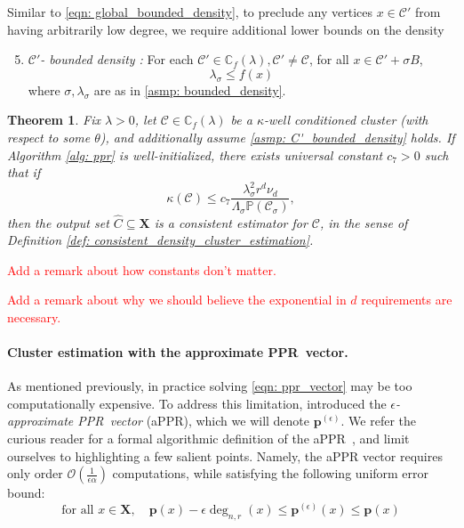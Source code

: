 \documentclass{article}
\newcommand{\1}{\mathbf{1}}
\newcommand{\pbf}{\mathbf{p}}
\newcommand{\Xbf}{\mathbf{X}}
\newcommand{\Pbb}{\mathbb{P}}
\newcommand{\Cbb}{\mathbb{C}}
\newcommand{\Cset}{\mathcal{C}}
\newcommand{\Csig}{\Cset_{\sigma}}
\newcommand{\pprspace}{{\sc PPR~}}
\theoremstyle{aldenthm}
\newtheorem{theorem}{Theorem}
\theoremstyle{aldenrmrk}
\begin{document}
Similar to \eqref{eqn: global_bounded_density}, to preclude any vertices $x \in \Cset'$ from having arbitrarily low degree, we require additional lower bounds on the density
\begin{enumerate}[label=(A\arabic*)]
	\setcounter{enumi}{4}
	\item 
	\label{asmp: C'_bounded_density}
	\emph{$\Cset'$- bounded density :} For each $\Cset' \in \Cbb_f(\lambda), \Cset' \neq \Cset$, for all $x \in \Cset' + \sigma B$,
	\begin{equation*}
	\lambda_{\sigma} \leq f(x)
	\end{equation*}
	where $\sigma,\lambda_{\sigma}$ are as in \ref{asmp: bounded_density}.
\end{enumerate}

\begin{theorem}
	\label{thm: consistent_recovery_of_density_clusters}
	Fix $\lambda > 0$, let $\Cset \in \Cbb_f(\lambda)$ be a $\kappa$-well conditioned cluster (with respect to some $\theta$), and additionally assume \ref{asmp: C'_bounded_density} holds. If Algorithm \ref{alg: ppr} is well-initialized, there exists universal constant $c_7 > 0$ such that if
	\begin{equation}
	\label{eqn: kappa_ub}
	\kappa(\Cset) \leq c_7 \frac{\lambda_{\sigma}^2r^d \nu_d}{\Lambda_{\sigma}\Pbb(\Csig)},
	\end{equation}
	then the output set $\widehat{C} \subseteq \Xbf$ is a consistent estimator for $\Cset$, in the sense of Definition \ref{def: consistent_density_cluster_estimation}.
\end{theorem}

\textcolor{red}{Add a remark about how constants don't matter.}

\textcolor{red}{Add a remark about why we should believe the exponential in $d$ requirements are necessary.}



\paragraph{Cluster estimation with the approximate \pprspace vector.}

As mentioned previously, in practice solving \eqref{eqn: ppr_vector} may be too computationally expensive. To address this limitation, \citet{andersen2006} introduced the \emph{$\epsilon$-approximate \pprspace vector} (aPPR), which we will denote $\pbf^{(\epsilon)}$. We refer the curious reader \citep{anderson2006} for a formal algorithmic definition of the a\pprspace, and limit ourselves to highlighting a few salient points. Namely, the aPPR vector requires only order $\mathcal{O}\left(\frac{1}{\epsilon \alpha}\right)$ computations, while satisfying the following uniform error bound:
\begin{equation}
\label{eqn: appr_error}
\textrm{for all $x \in \Xbf$}, \quad \pbf(x) - \epsilon \deg_{n,r}(x)\leq \pbf^{(\epsilon)}(x) \leq \pbf(x)
\end{equation}
\end{document}
